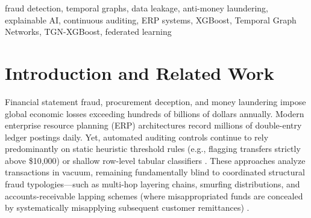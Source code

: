 \documentclass[journal]{IEEEtran}
\begin{document}
\begin{IEEEkeywords}
fraud detection, temporal graphs, data leakage, anti-money laundering, explainable AI, continuous auditing, ERP systems, XGBoost, Temporal Graph Networks, TGN-XGBoost, federated learning
\end{IEEEkeywords}

\section{Introduction and Related Work}\label{sec:intro}

Financial statement fraud, procurement deception, and money laundering impose global economic losses exceeding hundreds of billions of dollars annually. Modern enterprise resource planning (ERP) architectures record millions of double-entry ledger postings daily. Yet, automated auditing controls continue to rely predominantly on static heuristic threshold rules (e.g., flagging transfers strictly above \$10,000) or shallow row-level tabular classifiers \cite{salih2021survey}. These approaches analyze transactions in vacuum, remaining fundamentally blind to coordinated structural fraud typologies---such as multi-hop layering chains, smurfing distributions, and accounts-receivable lapping schemes (where misappropriated funds are concealed by systematically misapplying subsequent customer remittances) \cite{motie2024gnn,salih2021survey}.
\end{document}
